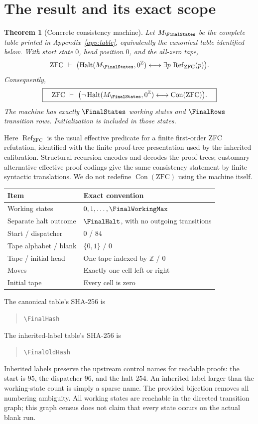 \documentclass[11pt,letterpaper]{article}
\newtheorem{theorem}{Theorem}[section]
\theoremstyle{definition}\newtheorem{definition}[theorem]{Definition}
\newcommand{\Con}{\operatorname{Con}}
\newcommand{\Halt}{\operatorname{Halt}}
\newcommand{\ProofRef}{\operatorname{Ref}}
\newcommand{\ZFC}{\mathrm{ZFC}}
\newcommand{\blank}{0^{\mathbb Z}}
\newcommand{\hash}[1]{\begin{quote}\footnotesize\expandafter\nolinkurl\expandafter{#1}\end{quote}}
\begin{document}
\tableofcontents
\newpage

\section{The result and its exact scope}

\begin{theorem}[Concrete consistency machine]\label{thm:main}
Let $M_{\FinalStates}$ be the complete table printed in
Appendix~\ref{app:table}, equivalently the canonical table identified below.
With start state $0$, head position $0$, and the all-zero tape,
\[
 \ZFC\ \vdash\
 \bigl(\Halt(M_{\FinalStates},\blank)
       \longleftrightarrow
       \exists p\,\ProofRef_{\ZFC}(p)\bigr).
\]
Consequently,
\[
 \boxed{\quad\ZFC\ \vdash\
  \bigl(\neg\Halt(M_{\FinalStates},\blank)
         \longleftrightarrow\Con(\ZFC)\bigr).\quad}
\]
The machine has exactly $\FinalStates$ working states and $\FinalRows$
transition rows.  Initialization is included in those states.
\end{theorem}

Here $\ProofRef_{\ZFC}$ is the usual effective predicate for a finite
first-order ZFC refutation, identified with the finite proof-tree
presentation used by the inherited calibration.  Structural recursion
encodes and decodes the proof trees; customary alternative effective
proof codings give the same consistency statement by finite syntactic
translations.  We do not redefine $\Con(\ZFC)$ using the machine itself.

\begin{center}
\begin{tabular}{ll}
\toprule
Item & Exact convention\\\midrule
Working states & $0,1,\ldots,\FinalWorkingMax$\\
Separate halt outcome & $\FinalHalt$, with no outgoing transitions\\
Start / dispatcher & $0$ / $84$\\
Tape alphabet / blank & $\{0,1\}$ / $0$\\
Tape / initial head & One tape indexed by $\mathbb Z$ / $0$\\
Moves & Exactly one cell left or right\\
Initial tape & Every cell is zero\\
\bottomrule
\end{tabular}
\end{center}

The canonical table's SHA-256 is
\hash{\FinalHash}
The inherited-label table's SHA-256 is
\hash{\FinalOldHash}
Inherited labels preserve the upstream control names for readable proofs:
the start is $95$, the dispatcher $96$, and the halt $254$.  An inherited
label larger than the working-state count is simply a sparse name.  The
provided bijection removes all numbering ambiguity.  All working states
are reachable in the directed transition graph; this graph census does
not claim that every state occurs on the actual blank run.
\end{document}

